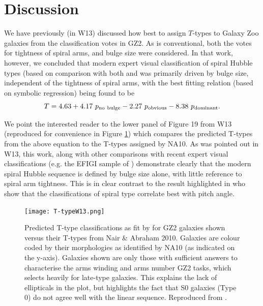 \documentclass[usenatbib]{mn2e}
\newcommand{\be}{\begin{equation}}
\newcommand{\ee}{\end{equation}}
\begin{document}
\section{Discussion} \label{discussion}

 
 We have previously (in W13) discussed how best to assign $T$-types to Galaxy Zoo galaxies from the classification votes in GZ2. As is conventional, both the votes for tightness of spiral arms, and bulge size were considered. In that work, however, we concluded that modern expert visual classification of spiral Hubble types (based on comparison with both \citet[hereafter NA10]{Nair2010a} and \citet{EFIGI} was primarily driven by bulge size, independent of the tightness of spiral arms, with the best fitting relation (based on symbolic regression) being found to be
 \be
 T = 4.63 + 4.17~p_{\rm no~bulge} - 2.27~p_{\rm obvious} - 8.38~p_{\rm dominant}. 
 \ee 
 
We point the interested reader to the lower panel of Figure 19 from W13 (reproduced for convenience in Figure \ref{T-type}) which compares the predicted T-types from the above equation to the T-types assigned by NA10. As was pointed out in W13, this work, along with other comparisons with recent expert visual classifications (e.g. the EFIGI sample of \citealt{EFIGI}) demonstrate clearly that the modern spiral Hubble sequence is defined by bulge size alone, with little reference to spiral arm tightness. This is in clear contrast to the result highlighted in \citet{kennicutt1981} who show that the \citet{sandagetammann1981} classifications of spiral type correlate best with pitch angle. 


\begin{figure}
\texttt{[image: T-typeW13.png]}
\caption{Predicted T-type classifications as fit by \citet{Willett2013} for GZ2 galaxies shown versus their T-types from Nair \& Abraham 2010. Galaxies are colour coded by their morphologies as identified by NA10 (as indicated on the y-axis). Galaxies shown are only those with sufficient answers to characterise the arms winding and arms number GZ2 tasks, which selects heavily for late-type galaxies. This explains the lack of ellipticals in the plot, but highlights the fact that S0 galaxies (Type 0) do not agree well with the linear sequence. Reproduced from \citet{Willett2013}.  \label{T-type}}
\end{figure}
\end{document}
